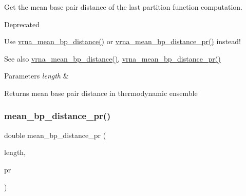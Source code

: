 Get the mean base pair distance of the last partition function computation. 

\begin{DoxyRefDesc}{Deprecated}
\item[\mbox{\hyperlink{deprecated__deprecated000103}{Deprecated}}]Use \mbox{\hyperlink{group__part__func__global_gaa6b8983b559b9ef4b2e1b31113ea317b}{vrna\+\_\+mean\+\_\+bp\+\_\+distance()}} or \mbox{\hyperlink{group__part__func__global_gad3f0c240512e6d43e2e4d4c2076021f5}{vrna\+\_\+mean\+\_\+bp\+\_\+distance\+\_\+pr()}} instead! \end{DoxyRefDesc}
\begin{DoxySeeAlso}{See also}
\mbox{\hyperlink{group__part__func__global_gaa6b8983b559b9ef4b2e1b31113ea317b}{vrna\+\_\+mean\+\_\+bp\+\_\+distance()}}, \mbox{\hyperlink{group__part__func__global_gad3f0c240512e6d43e2e4d4c2076021f5}{vrna\+\_\+mean\+\_\+bp\+\_\+distance\+\_\+pr()}}
\end{DoxySeeAlso}

\begin{DoxyParams}{Parameters}
{\em length} & \\
\hline
\end{DoxyParams}
\begin{DoxyReturn}{Returns}
mean base pair distance in thermodynamic ensemble 
\end{DoxyReturn}
\mbox{\label{group__part__func__global__deprecated_gad5ba36cef8d01cf4244cc09b9bf1ce1d}} 
\subsubsection{\texorpdfstring{mean\_bp\_distance\_pr()}{mean\_bp\_distance\_pr()}}
{\footnotesize\ttfamily double mean\+\_\+bp\+\_\+distance\+\_\+pr (\begin{DoxyParamCaption}\item[{int}]{length,  }\item[{\mbox{\hyperlink{group__data__structures_ga31125aeace516926bf7f251f759b6126}{F\+L\+T\+\_\+\+O\+R\+\_\+\+D\+BL}} $\ast$}]{pr }\end{DoxyParamCaption})}



